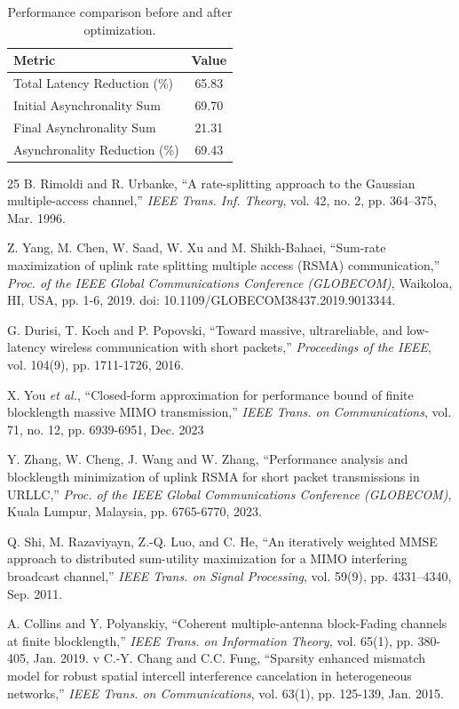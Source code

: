 \documentclass[a4paper, 12pt, onecolumn, journal, twoside, draftclsnofoot]{IEEEtran}
\begin{document}
\FloatBarrier

\begin{table}[h]
\centering
\begin{tabular}{l c}
\hline
Metric & Value \\
\hline
Total Latency Reduction (\%) & 65.83 \\
Initial Asynchronality Sum & 69.70 \\
Final Asynchronality Sum & 21.31 \\
Asynchronality Reduction (\%) & 69.43 \\
\hline
\end{tabular}
\caption{Performance comparison before and after optimization.}
\end{table}
\newpage
\begin{thebibliography}{25}
B. Rimoldi and R. Urbanke, ``A rate-splitting approach to the Gaussian multiple-access channel,'' \emph{IEEE Trans. Inf. Theory},  vol. 42, no. 2, pp. 364–375, Mar. 1996.

Z. Yang, M. Chen, W. Saad, W. Xu and M. Shikh-Bahaei, ``Sum-rate maximization of uplink rate splitting multiple access (RSMA) communication,'' \emph{Proc. of the IEEE Global Communications Conference (GLOBECOM)}, Waikoloa, HI, USA, pp. 1-6, 2019.  doi: 10.1109/GLOBECOM38437.2019.9013344.

G. Durisi, T. Koch and P. Popovski, ``Toward massive, ultrareliable, and low-latency wireless communication with short packets,'' \emph{Proceedings of the IEEE}, vol. 104(9), pp. 1711-1726, 2016.

X. You \emph{et al.}, ``Closed-form approximation for performance bound of finite blocklength massive MIMO transmission,'' \emph{IEEE Trans. on Communications}, vol. 71, no. 12, pp. 6939-6951, Dec. 2023

Y. Zhang, W. Cheng, J. Wang and W. Zhang, ``Performance analysis and blocklength minimization of uplink RSMA for short packet transmissions in URLLC,'' \emph{Proc. of the IEEE Global Communications Conference (GLOBECOM)}, Kuala Lumpur, Malaysia, pp. 6765-6770, 2023.

Q. Shi, M. Razaviyayn, Z.-Q. Luo, and C. He, ``An iteratively weighted MMSE approach to distributed sum-utility maximization for a MIMO interfering broadcast channel,'' \emph{IEEE Trans. on Signal Processing}, vol. 59(9), pp. 4331–4340, Sep. 2011.

A. Collins and Y. Polyanskiy, ``Coherent multiple-antenna block-Fading channels at finite blocklength,'' \emph{IEEE Trans. on Information Theory,} vol. 65(1), pp. 380-405, Jan. 2019.
v
C.-Y. Chang and C.C. Fung, ``Sparsity enhanced mismatch model for robust spatial intercell interference cancelation in heterogeneous networks,'' \emph{IEEE Trans. on Communications}, vol. 63(1), pp. 125-139, Jan. 2015.


\end{thebibliography}
\end{document}
